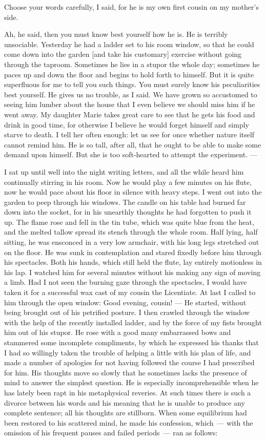 \documentclass[12pt]{article}
\begin{document}
Choose your words carefully, I said, for he is my own first cousin
on my mother's side.

Ah, he said, then you must know best yourself how he is. He is
terribly unsociable. Yesterday he had a ladder set to his room window,
so that he could come down into the garden [and take his customary]
exercise without going through the taproom. Sometimes he lies in a
stupor the whole day; sometimes he paces up and down the floor and
begins to hold forth to himself. But it is quite superfluous for me
to tell you such things. You must surely know his peculiarities best
yourself. He gives us no trouble, as I said. We have grown so
accustomed to seeing him lumber about the house that I even believe we
should miss him if he went away. My daughter Marie takes great care
to see that he gets his food and drink in good time, for otherwise I
believe he would forget himself and simply starve to death. I tell
her often enough: let us see for once whether nature itself cannot
remind him. He is so tall, after all, that he ought to be able to
make some demand upon himself. But she is too soft-hearted to attempt
the experiment. ---

I sat up until well into the night writing letters, and all the while
heard him continually stirring in his room. Now he would play a few
minutes on his flute, now he would pace about his floor in silence
with heavy steps. I went out into the garden to peep through his
windows. The candle on his table had burned far down into the socket,
for in his unearthly thoughts he had forgotten to push it up. The
flame rose and fell in the tin tube, which was quite blue from the
heat, and the melted tallow spread its stench through the whole room.
Half lying, half sitting, he was ensconced in a very low armchair,
with his long legs stretched out on the floor. He was sunk in
contemplation and stared fixedly before him through his spectacles.
Both his hands, which still held the flute, lay entirely motionless
in his lap. I watched him for several minutes without his making any
sign of moving a limb. Had I not seen the burning gaze through the
spectacles, I would have taken it for a successful wax cast of my
cousin the Licentiate. At last I called to him through the open
window: Good evening, cousin! --- He started, without being brought
out of his petrified posture. I then crawled through the window with
the help of the recently installed ladder, and by the force of my
fists brought him out of his stupor. He rose with a good many
embarrassed bows and stammered some incomplete compliments, by which
he expressed his thanks that I had so willingly taken the trouble of
helping a little with his plan of life, and made a number of
apologies for not having followed the course I had prescribed for
him. His thoughts move so slowly that he sometimes lacks the presence
of mind to answer the simplest question. He is especially
incomprehensible when he has lately been rapt in his metaphysical
reveries. At such times there is such a divorce between his words and
his meaning that he is unable to produce any complete sentence; all
his thoughts are stillborn. When some equilibrium had been restored
to his scattered mind, he made his confession, which~--- with the
omission of his frequent pauses and failed periods~--- ran as follows:
\end{document}
